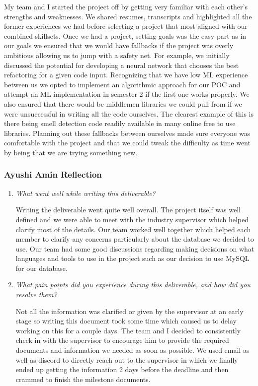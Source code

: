 \documentclass{article}
\begin{document}
\begin{enumerate}
    My team and I started the project off by getting very familiar with each other’s strengths and weaknesses. We shared resumes, transcripts and highlighted all the former experiences we had before selecting a project that most aligned with our combined skillsets. Once we had a project, setting goals was the easy part as in our goals we ensured that we would have fallbacks if the project was overly ambitious allowing us to jump with a safety net. For example, we initially discussed the potential for developing a neural network that chooses the best refactoring for a given code input. Recognizing that we have low ML experience between us we opted to implement an algorithmic approach for our POC and attempt an ML implementation in semester 2 if the first one works properly. We also ensured that there would be middlemen libraries we could pull from if we were unsuccessful in writing all the code ourselves. The clearest example of this is there being smell detection code readily available in many online free to use libraries. Planning out these fallbacks between ourselves made sure everyone was comfortable with the project and that we could tweak the difficulty as time went by being that we are trying something new.


\end{enumerate}  

\subsubsection*{Ayushi Amin Reflection}

\begin{enumerate}
    \item \textit{What went well while writing this deliverable?}
    
      Writing the deliverable went quite well overall. The project itself was well defined and we were able to meet with the industry supervisor which helped clarify most of the details. Our team worked well together which helped each member to clarify any concerns particularly about the database we decided to use. Our team had some good discussions regarding making decisions on  what languages and tools to use in the project such as our decision to use MySQL for our database.

    \item \textit{What pain points did you experience during this deliverable, and how did you resolve them?}
    
    Not all the information was clarified or given by the supervisor at an early stage so writing this document took some time which caused us to delay working on this for a couple days. The team and I decided to consistently check in with the supervisor to encourage him to provide the required documents and information we needed as soon as possible. We used email as well as discord to directly reach out to the supervisor in which we finally ended up getting the information 2 days before the deadline and then crammed to finish the milestone documents.
    
\end{enumerate}  
\end{document}
